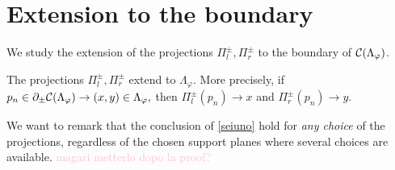 \section{Extension to the boundary}
We study the extension of the projections $\Pi_l^\pm, \Pi_r^\pm$ to the boundary of $\mathcal{C}(\Lambda_\varphi)$. 

\begin{proposition}\label{seiuno}
    The projections $\Pi_l^\pm, \Pi_r^\pm$ extend to $\Lambda_\varphi$. More precisely, if $p_n\in\partial_\pm\mathcal{C}(\Lambda_\varphi)\to(x,y)\in\Lambda_\varphi,$ then $\Pi_l^\pm(p_n)\to x$ and $\Pi_r^\pm(p_n)\to y$.
\end{proposition}

We want to remark that the conclusion of \ref{seiuno} hold for \textit{any choice} of the projections, regardless of the chosen support planes where several choices are available. \textcolor{pink}{magari metterlo dopo la proof?}

